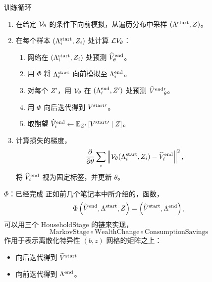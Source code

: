 \documentclass[10pt,aspectratio=169]{beamer}
\begin{document}
\begin{frame}{训练循环}
  \begin{enumerate}
    \item 在给定 $\mathcal{V}_\theta$ 的条件下向前模拟，从遍历分布中采样 $(\Lambda^{\mathrm{start}}, Z)$。
    \item 在每个样本 $(\Lambda^{\mathrm{start}}_i, Z_i)$ 处计算 $\mathcal{L} V_\theta$：
    \begin{enumerate}
      \item 网络在 $(\Lambda^{\mathrm{start}}_i, Z_i)$ 处预测 $\widehat{V}^{\mathrm{end}}_\theta$。
      \item 用 $\Phi$ 将 $\Lambda^{\mathrm{start}}_i$ 向前模拟至 $\Lambda^{\mathrm{end}}_i$。
      \item 对每个 $Z'$，用 $\mathcal{V}_\theta$ 在 $(\Lambda^{\mathrm{end}}_i, Z')$ 处预测 $\widehat{V}^{\mathrm{end}}{}'_\theta$。
      \item 用 $\Phi$ 向后迭代得到 $V^{\mathrm{start}}{}'$。
      \item 取期望 $\widehat{V}^{\mathrm{end}}_i \leftarrow \mathbb{E}_{Z'}\left[ V^{\mathrm{start}}{}'\mid Z \right]$。
    \end{enumerate}
    \item 计算损失的梯度，
    \[
      \frac{\partial}{\partial\theta}\sum_i\left\| \mathcal{V}_\theta(\Lambda^{\mathrm{start}}_i, Z_i) - \widehat{V}^{\mathrm{end}}_i \right\|^2,
    \]
    将 $\widehat{V}^{\mathrm{end}}_i$ 视为固定标签，并更新 $\theta$。
  \end{enumerate}
\end{frame}

\begin{frame}{$\Phi$：已经完成}
  正如前几个笔记本中所介绍的，函数，
  \[
    \Phi\left( \widetilde{V}^{\mathrm{end}}, \Lambda^{\mathrm{start}}, Z \right) = \left( \widetilde{V}^{\mathrm{start}}, \Lambda^{\mathrm{end}} \right),
  \]
  可以用三个 HouseholdStage 的链来实现，
  \[
    \text{MarkovStage}\circ\text{WealthChange}\circ\text{ConsumptionSavings}
  \]
  作用于表示离散化特异性 $(b, z)$ 网格的矩阵之上：
  \begin{itemize}
    \item 向后迭代得到 $\widetilde{V}^{\mathrm{start}}$
    \item 向前迭代得到 $\Lambda^{\mathrm{end}}$。
  \end{itemize}
\end{frame}
\end{document}
